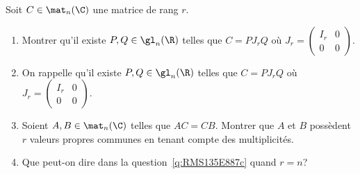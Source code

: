 \begin{enonce}
\begin{exercise}[ID={RMS135 E887edit},subtitle={Mines-Ponts PSI 2024},tags={oraux},difficulty={}]
  Soit $C\in\mat_n(\C)$ une matrice de rang $r$.

  \begin{enumerate}

  \item Montrer qu'il existe $P,Q\in\gl_n(\R)$ telles que $C = P J_r Q$ où $J_r = \begin{pmatrix} I_r & 0\\ 0 & 0 \end{pmatrix}$.

  \item[] On rappelle  qu'il existe $P,Q\in\gl_n(\R)$ telles que $C = P J_r Q$ où $J_r = \begin{pmatrix} I_r & 0\\ 0 & 0 \end{pmatrix}$.

    \item\label{q:RMS135E887c} Soient $A,B\in\mat_n(\C)$ telles que $AC = CB$.
      Montrer que $A$ et $B$ possèdent $r$ valeurs propres communes en tenant compte des multiplicités.

    \item Que peut-on dire dans la question~\ref{q:RMS135E887c} quand $r=n$?
  \end{enumerate}
\end{exercise}
\begin{solution}
\end{solution}
\end{enonce}
